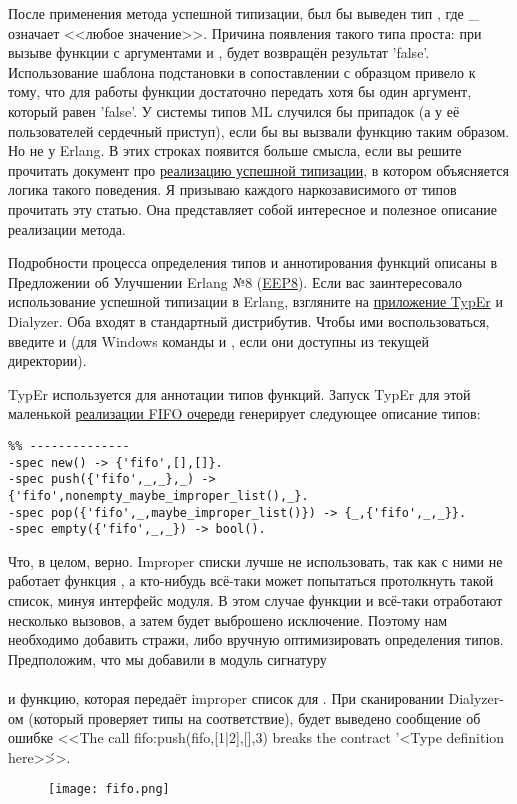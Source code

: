 После применения метода успешной типизации, был бы выведен тип , где \_ означает <<любое значение>>.
Причина появления такого типа проста: при вызыве функции с аргументами  и , будет возвращён результат 'false'.
Использование шаблона подстановки \ops{\strut\_} в сопоставлении с образцом привело к тому, что для работы функции достаточно передать хотя бы один аргумент, который равен 'false'.
У системы типов ML случился бы припадок (а у её пользователей сердечный приступ), если бы вы вызвали функцию таким образом.
Но не у Erlang.
В этих строках появится больше смысла, если вы решите прочитать документ про \href{http://www.it.uu.se/research/group/hipe/papers/succ\_types.pdf}{реализацию успешной типизации}, в котором объясняется логика такого поведения.
Я призываю каждого наркозависимого от типов прочитать эту статью.
Она представляет собой интересное и полезное описание реализации метода.

Подробности процесса определения типов и аннотирования функций описаны в Предложении об Улучшении Erlang №8 (\href{http://www.erlang.org/eeps/eep-0008.html}{EEP8}).
Если вас заинтересовало использование успешной типизации в Erlang, взгляните на \href{http://user.it.uu.se/~tobiasl/publications/typer.pdf}{приложение TypEr} и Dialyzer.
Оба входят в стандартный дистрибутив.
Чтобы ими воспользоваться, введите  и  (для Windows команды  и , если они доступны из текущей директории).

TypEr используется для аннотации типов функций.
Запуск TypEr для этой маленькой \href{http://learnyousomeerlang.com/static/erlang/fifo.erl}{реализации FIFO очереди} генерирует следующее описание типов:
\begin{lstlisting}[style=erlang]
%% File: fifo.erl
%% --------------
-spec new() -> {'fifo',[],[]}.
-spec push({'fifo',_,_},_) -> {'fifo',nonempty_maybe_improper_list(),_}.
-spec pop({'fifo',_,maybe_improper_list()}) -> {_,{'fifo',_,_}}.
-spec empty({'fifo',_,_}) -> bool().
\end{lstlisting}

Что, в целом, верно.
Improper списки лучше не использовать, так как с ними не работает функция , а кто\--нибудь всё\--таки может попытаться протолкнуть такой список, минуя интерфейс модуля.
В этом случае функции  и  всё\--таки отработают несколько вызовов, а затем будет выброшено исключение.
Поэтому нам необходимо добавить стражи, либо вручную оптимизировать определения типов.
Предположим, что мы добавили в модуль сигнатуру\\
\\
и функцию, которая передаёт improper список для .
При сканировании Dialyzer\--ом (который проверяет типы на соответствие), будет выведено сообщение об ошибке <<The call fifo:push({fifo,[1|2],[]},3) breaks the contract '<Type definition here>\'>>.
\begin{figure}[h!]
    \centering
    \texttt{[image: fifo.png]}
\end{figure} 

